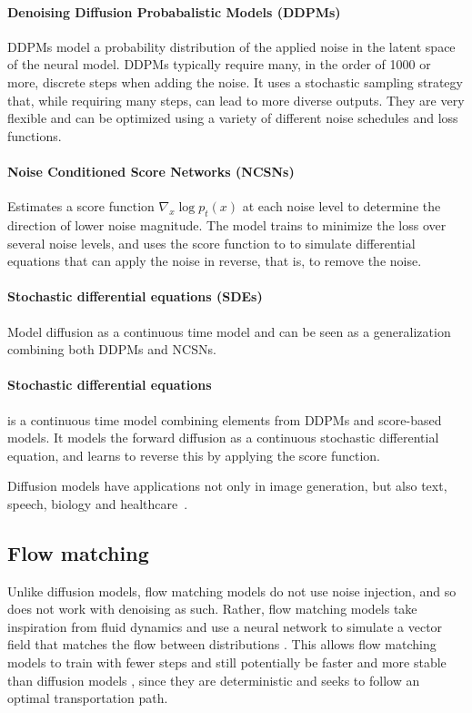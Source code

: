 \documentclass{article}
\begin{document}
\paragraph{Denoising Diffusion Probabalistic Models (DDPMs)}
DDPMs model a probability distribution of the applied noise in the latent space of the neural model. DDPMs typically require many, in the order of 1000 or more, discrete steps when adding the noise. It uses a stochastic sampling strategy that, while requiring many steps, can lead to more diverse outputs. They are very flexible and can be optimized using a variety of different noise schedules and loss functions.

\paragraph{Noise Conditioned Score Networks (NCSNs)}
Estimates a score function $\nabla_x \log p_t(x)$ at each noise level to determine the direction of lower noise magnitude. The model trains to minimize the loss over several noise levels, and uses the score function to to simulate differential equations that can apply the noise in reverse, that is, to remove the noise.

\paragraph{Stochastic differential equations (SDEs)}
Model diffusion as a continuous time model and can be seen as a generalization combining both DDPMs and NCSNs.

\paragraph{Stochastic differential equations} is a continuous time model combining elements from DDPMs and score-based models. It models the forward diffusion as a continuous stochastic differential equation, and learns to reverse this by applying the score function.

Diffusion models have applications not only in image generation, but also text, speech, biology and healthcare~\cite{cao2024survey}.

\subsection{Flow matching}

Unlike diffusion models, flow matching models do not use noise injection, and so does not work with denoising as such. Rather, flow matching models take inspiration from fluid dynamics and use a neural network to simulate a vector field that matches the flow between distributions \cite{holderrieth2025introduction}. This allows flow matching models to train with fewer steps \cite{kornilov2024optimal} and still potentially be faster and more stable than diffusion models \cite{lipman2022flow}, since they are deterministic and seeks to follow an optimal transportation path.
\end{document}
